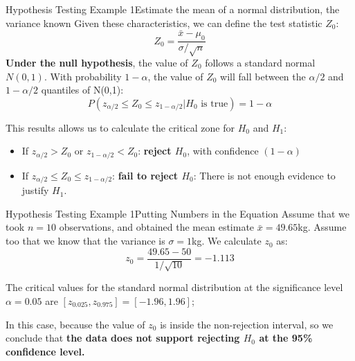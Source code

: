\begin{frame}{Hypothesis Testing Example 1}{Estimate the mean of a normal distribution, the variance known}
  Given these characteristics, we can define the test statistic $Z_0$:
  \begin{equation*}
    Z_0 = \frac{\bar{x} - \mu_0}{\sigma / \sqrt{n}}
  \end{equation*}
  {\bf Under the null hypothesis}, the value of ${Z_0}$ follows a standard normal $N(0,1)$. With probability $1-\alpha$, the value of $Z_0$ will fall between the $\alpha/2$ and $1-\alpha/2$ quantiles of N(0,1):
  \begin{equation*}
    P(z_{\alpha/2} \leq Z_0 \leq z_{1-\alpha/2}|H_0\text{ is true}) = 1-\alpha
  \end{equation*}

  This results allows us to calculate the critical zone for $H_0$ and $H_1$:
  \begin{itemize}
    \item If $z_{\alpha/2} > Z_0$ or $z_{1-\alpha/2} < Z_0$: {\bf reject $H_0$}, with confidence $(1-\alpha)$
    \item If $z_{\alpha/2} \leq Z_0 \leq z_{1-\alpha/2}$: {\bf fail to reject $H_0$}: There is not enough evidence to justify $H_1$.
  \end{itemize}
\end{frame}

\begin{frame}{Hypothesis Testing Example 1}{Putting Numbers in the Equation}
  Assume that we took $n=10$ observations, and obtained the mean estimate $\bar{x} = 49.65$kg. Assume too that we know that the variance is $\sigma = 1$kg. We calculate $z_0$ as:
  \begin{equation*}
    z_0 = \frac{49.65 - 50}{1 / \sqrt{10}} = -1.113
  \end{equation*}\bigskip

  The critical values for the standard normal distribution at the significance level $\alpha = 0.05$ are $[z_{0.025}, z_{0.975}] = [-1.96,1.96]$;\bigskip

  In this case, because the value of $z_0$ is inside the non-rejection interval, so we conclude that {\bf the data does not support rejecting $H_0$ at the 95\% confidence level.}
\end{frame}

